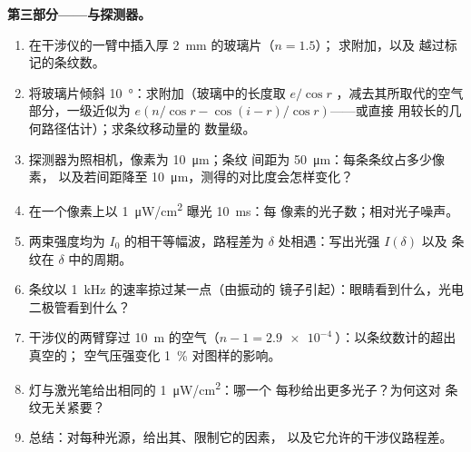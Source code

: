 \begin{problem}
\medskip
\noindent\textbf{第三部分——与探测器。}
\begin{enumerate}[resume]
  \item 在干涉仪的一臂中插入厚 \qty{2}{mm} 的玻璃片（$n = 1.5$）；
        求附加，以及
        越过标记的条纹数。
  \item 将玻璃片倾斜 \qty{10}{\degree}：求附加（玻璃中的长度取 $e/\cos r$
        ，减去其所取代的空气部分，一级近似为
        $e(n/\cos r - \cos(i - r)/\cos r)$——或直接
        用较长的几何路径估计）；求条纹移动量的
        数量级。
  \item 探测器为照相机，像素为 \qty{10}{\micro m}；条纹
        间距为 \qty{50}{\micro m}：每条条纹占多少像素，
        以及若间距降至
        \qty{10}{\micro m}，测得的对比度会怎样变化？
  \item 在一个像素上以 \qty{1}{\micro W/cm^2} 曝光 \qty{10}{ms}：每
        像素的光子数；相对光子噪声。
  \item 两束强度均为 $I_0$ 的相干等幅波，路程差为
        $\delta$ 处相遇：写出光强 $I(\delta)$ 以及
        条纹在 $\delta$ 中的周期。
  \item 条纹以 \qty{1}{kHz} 的速率掠过某一点（由振动的
        镜子引起）：眼睛看到什么，光电二极管看到什么？
  \item 干涉仪的两臂穿过 \qty{10}{m} 的空气（$n - 1 =
        \qty{2.9e-4}{}$）：以条纹数计的超出真空的；
        空气压强变化 \qty{1}{\%} 对图样的影响。
  \item 灯与激光笔给出相同的 \qty{1}{\micro W/cm^2}：哪一个
        每秒给出更多光子？为何这对
        条纹无关紧要？
  \item 总结：对每种光源，给出其、限制它的因素，
        以及它允许的干涉仪路程差。
\end{enumerate}
\end{problem}
